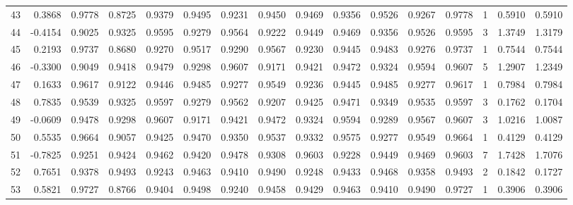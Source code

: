 \begin{tabular}{lrrrrrrrrrrrrrrr}
43  &      0.3868 &  0.9778 &  0.8725 &  0.9379 &  0.9495 &  0.9231 &  0.9450 &  0.9469 &  0.9356 &  0.9526 &   0.9267 &     0.9778 &      1 &                    0.5910 &                     0.5910 \\
44  &     -0.4154 &  0.9025 &  0.9325 &  0.9595 &  0.9279 &  0.9564 &  0.9222 &  0.9449 &  0.9469 &  0.9356 &   0.9526 &     0.9595 &      3 &                    1.3749 &                     1.3179 \\
45  &      0.2193 &  0.9737 &  0.8680 &  0.9270 &  0.9517 &  0.9290 &  0.9567 &  0.9230 &  0.9445 &  0.9483 &   0.9276 &     0.9737 &      1 &                    0.7544 &                     0.7544 \\
46  &     -0.3300 &  0.9049 &  0.9418 &  0.9479 &  0.9298 &  0.9607 &  0.9171 &  0.9421 &  0.9472 &  0.9324 &   0.9594 &     0.9607 &      5 &                    1.2907 &                     1.2349 \\
47  &      0.1633 &  0.9617 &  0.9122 &  0.9446 &  0.9485 &  0.9277 &  0.9549 &  0.9236 &  0.9445 &  0.9485 &   0.9277 &     0.9617 &      1 &                    0.7984 &                     0.7984 \\
48  &      0.7835 &  0.9539 &  0.9325 &  0.9597 &  0.9279 &  0.9562 &  0.9207 &  0.9425 &  0.9471 &  0.9349 &   0.9535 &     0.9597 &      3 &                    0.1762 &                     0.1704 \\
49  &     -0.0609 &  0.9478 &  0.9298 &  0.9607 &  0.9171 &  0.9421 &  0.9472 &  0.9324 &  0.9594 &  0.9289 &   0.9567 &     0.9607 &      3 &                    1.0216 &                     1.0087 \\
50  &      0.5535 &  0.9664 &  0.9057 &  0.9425 &  0.9470 &  0.9350 &  0.9537 &  0.9332 &  0.9575 &  0.9277 &   0.9549 &     0.9664 &      1 &                    0.4129 &                     0.4129 \\
51  &     -0.7825 &  0.9251 &  0.9424 &  0.9462 &  0.9420 &  0.9478 &  0.9308 &  0.9603 &  0.9228 &  0.9449 &   0.9469 &     0.9603 &      7 &                    1.7428 &                     1.7076 \\
52  &      0.7651 &  0.9378 &  0.9493 &  0.9243 &  0.9463 &  0.9410 &  0.9490 &  0.9248 &  0.9433 &  0.9468 &   0.9358 &     0.9493 &      2 &                    0.1842 &                     0.1727 \\
53  &      0.5821 &  0.9727 &  0.8766 &  0.9404 &  0.9498 &  0.9240 &  0.9458 &  0.9429 &  0.9463 &  0.9410 &   0.9490 &     0.9727 &      1 &                    0.3906 &                     0.3906 \\

\end{tabular}
